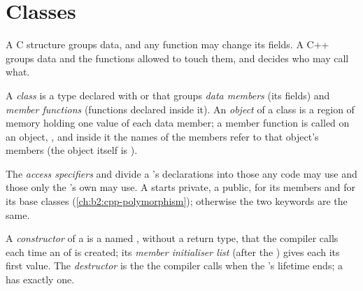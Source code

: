 \section{Classes}\label{sec:b2:cpp-classes-raii:classes}

A C structure groups data, and any function may change its fields. A C++  groups data and the functions
allowed to touch them, and decides who may call what.

\begin{definition}\label{def:b2:cpp-classes-raii:class}
A \emph{class} is a type declared with  or  that groups
\emph{data members} (its fields) and \emph{member functions} (functions
declared inside it). An \emph{object} of a class is a region of memory holding one value of each
data member; a member function is called on an object, , and inside it the names of the members
refer to that object's members (the object itself is ).
\end{definition}

\begin{definition}\label{def:b2:cpp-classes-raii:access}
The \emph{access specifiers}  and  divide a 's
declarations into those any code may use and those only the 's own  may use. A
 starts private, a  public, for its members and for its base classes
(\cref{ch:b2:cpp-polymorphism}); otherwise the two keywords are the same.
\end{definition}

\begin{definition}\label{def:b2:cpp-classes-raii:constructor}
A \emph{constructor} of a   is a  named , without a
return type, that the compiler calls each time an  of  is created; its \emph{member initialiser
list} (after the \code{:}) gives each  its first value. The \emph{destructor}
 is the  the compiler calls when the 's lifetime ends; a  has exactly one.
\end{definition}

